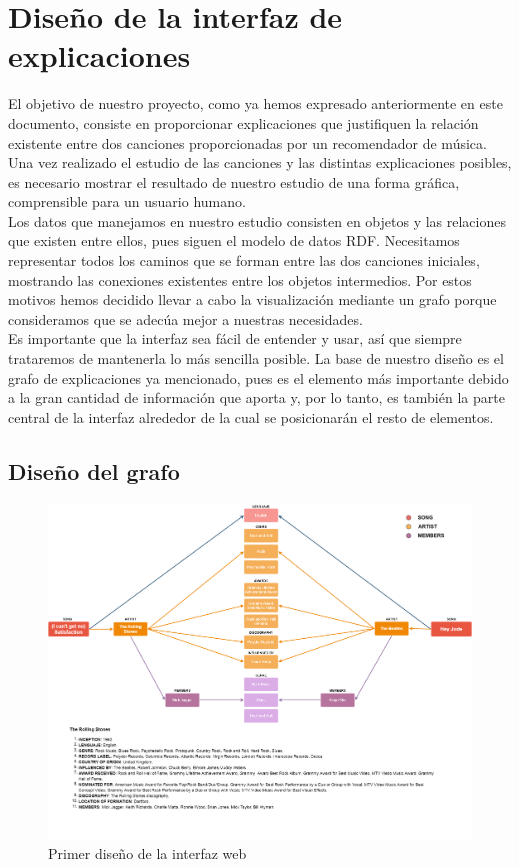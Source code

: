 \chapter{Diseño de la interfaz de explicaciones}
\label{cap:interfaz}

El objetivo de nuestro proyecto, como ya hemos expresado anteriormente en este documento, consiste en proporcionar explicaciones que justifiquen la relación existente entre dos canciones proporcionadas por un recomendador de música. Una vez realizado el estudio de las canciones y las distintas explicaciones posibles, es necesario mostrar el resultado de nuestro estudio de una forma gráfica, comprensible para un usuario humano.\\

Los datos que manejamos en nuestro estudio consisten en objetos y las relaciones que existen entre ellos, pues siguen el modelo de datos RDF. Necesitamos representar todos los caminos que se forman entre las dos canciones iniciales, mostrando las conexiones existentes entre los objetos intermedios. Por estos motivos hemos decidido llevar a cabo la visualización mediante un grafo porque consideramos que se adecúa mejor a nuestras necesidades.\\

Es importante que la interfaz sea fácil de entender y usar, así que siempre trataremos de mantenerla lo más sencilla posible. La base de nuestro diseño es el grafo de explicaciones ya mencionado, pues es el elemento más importante debido a la gran cantidad de información que aporta y, por lo tanto, es también la parte central de la interfaz alrededor de la cual se posicionarán el resto de elementos.\\

\section{Diseño del grafo}

\begin{figure}[h!]
	\centering
	\includegraphics[width = 1\textwidth]{Imagenes/Bitmap/InterfaceResult.png}
	\caption{Primer diseño de la interfaz web}
	\label{fig:sampleImage}
\end{figure}

